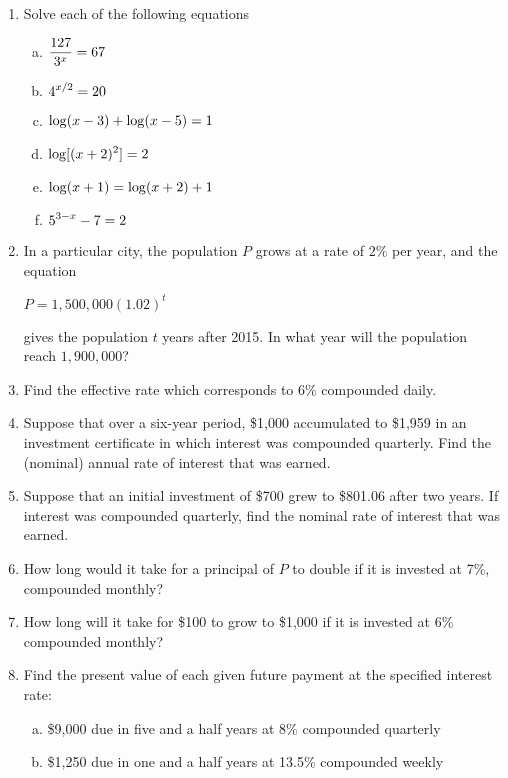 \documentclass[11pt]{exam}
\begin{document}
\begin{enumerate}
\item Solve each of the following equations
\begin{multicols}{2}
\begin{enumerate}[(a)]
\item $\displaystyle{\frac{127}{3^x} = 67}$
\item $\displaystyle{4^{x/2} = 20}$
\item $\displaystyle{\log(x - 3) + \log(x - 5) = 1}$
\item $\displaystyle{\log[(x+2)^{2}] = 2}$
\item $\displaystyle{\log(x + 1) = \log(x + 2) + 1}$
\item $\displaystyle{5^{3 - x} - 7 = 2}$
\end{enumerate}
\end{multicols}

\item In a particular city, the population $P$ grows at a rate of $2\%$ per year, and the equation
\begin{center}
$P = 1,500,000(1.02)^{t}$
\end{center}
gives the population $t$ years after 2015.  In what year will the population reach $1,900,000$?

\item Find the effective rate which corresponds to $6\%$ compounded daily.

\item Suppose that over a six-year period, \$1,000 accumulated to \$1,959 in an investment certificate in which interest was compounded quarterly.  Find the (nominal) annual rate of interest that was earned.

\item Suppose that an initial investment of \$700 grew to \$801.06 after two years.  If interest was compounded quarterly, find the nominal rate of interest that was earned.

\item How long would it take for a principal of $P$ to double if it is invested at 7\%, compounded monthly?

\item How long will it take for \$100 to grow to \$1,000 if it is invested at 6\% compounded monthly?

\item Find the present value of each given future payment at the specified interest rate:
\begin{enumerate}[(a)]
\item \$9,000 due in five and a half years at 8\% compounded quarterly
\item \$1,250 due in one and a half years at 13.5\% compounded weekly
\end{enumerate}


\end{enumerate}
\end{document}
